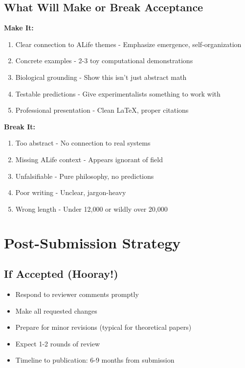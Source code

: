\documentclass[11pt]{article}
\begin{document}
\subsection{What Will Make or Break Acceptance}

\textbf{Make It:}
\begin{enumerate}[leftmargin=*]
    \item \textcolor{normal}{Clear connection to ALife themes} - Emphasize emergence, self-organization
    \item \textcolor{normal}{Concrete examples} - 2-3 toy computational demonstrations
    \item \textcolor{normal}{Biological grounding} - Show this isn't just abstract math
    \item \textcolor{normal}{Testable predictions} - Give experimentalists something to work with
    \item \textcolor{normal}{Professional presentation} - Clean LaTeX, proper citations
\end{enumerate}

\textbf{Break It:}
\begin{enumerate}[leftmargin=*]
    \item \textcolor{urgent}{Too abstract} - No connection to real systems
    \item \textcolor{urgent}{Missing ALife context} - Appears ignorant of field
    \item \textcolor{urgent}{Unfalsifiable} - Pure philosophy, no predictions
    \item \textcolor{urgent}{Poor writing} - Unclear, jargon-heavy
    \item \textcolor{urgent}{Wrong length} - Under 12,000 or wildly over 20,000
\end{enumerate}

\section{Post-Submission Strategy}

\subsection{If Accepted (Hooray!)}
\begin{itemize}[leftmargin=*]
    \item Respond to reviewer comments promptly
    \item Make all requested changes
    \item Prepare for minor revisions (typical for theoretical papers)
    \item Expect 1-2 rounds of review
    \item Timeline to publication: 6-9 months from submission
\end{itemize}
\end{document}
